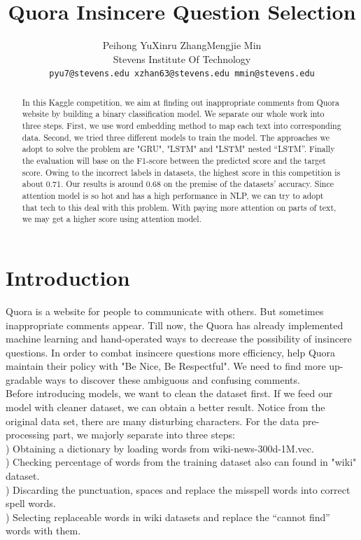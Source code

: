 \documentclass{article}
\title{Quora Insincere Question Selection}
\author{%
  Peihong Yu\quad  Xinru Zhang\quad Mengjie Min\\
  Stevens Institute Of Technology\\
  \texttt{pyu7@stevens.edu\quad
  	xzhan63@stevens.edu\quad
  	mmin@stevens.edu} \\
}
\begin{document}

\maketitle
\begin{abstract}
	In this Kaggle competition, we aim at finding out inappropriate comments from Quora website by building a binary classification model. We separate our whole work into three steps. First, we use word embedding method to map each text into corresponding data. Second, we tried three different models to train the model. The approaches we adopt to solve the problem are "GRU", "LSTM" and "LSTM" nested “LSTM”. Finally the evaluation will base on the F1-score between the predicted score and the target score. Owing to the incorrect labels in datasets, the highest score in this competition is about 0.71. Our results is around 0.68 on the premise of  the datasets’ accuracy. Since attention model is so hot and has a high performance in NLP, we can try to adopt that tech to this deal with this problem. With paying more attention on parts of text, we may get a higher score using attention model.\\
\end{abstract}
\setlength{\parskip}{0.3em}
\section{Introduction}
\noindent Quora is a website for people to communicate with others. But sometimes inappropriate comments appear. Till now, the Quora has already implemented machine learning and hand-operated ways to decrease the possibility of insincere questions. In order to combat insincere questions more efficiency, help Quora maintain their policy with "Be Nice, Be Respectful". We need to find more up-gradable ways to discover these ambiguous and confusing comments.\\

\noindent Before introducing models, we want to clean the dataset first. If we feed our model with cleaner dataset, we can obtain a better result. Notice from the original data set, there are many disturbing characters. For the data pre-processing part, we majorly separate into three steps: \\

) Obtaining a dictionary by loading words from wiki-news-300d-1M.vec. \\
) Checking percentage of words from the training dataset also can found in "wiki" dataset.\\
) Discarding the punctuation, spaces and replace the misspell words into correct spell words.\\
) Selecting replaceable words in wiki datasets and replace the “cannot find” words with them.\\
\end{document}
